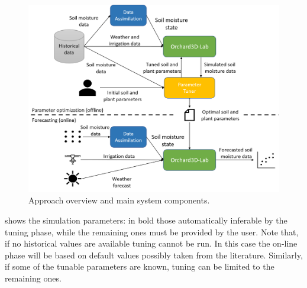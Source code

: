 \begin{figure}[t]
	\centering
	\includegraphics[scale=.5]{chapters/physics-aware/orchard/img/overview3.png}
	\caption{Approach overview and main system components.}
	\label{orchard-fig:overview}
\end{figure}

 shows the simulation parameters: in bold those automatically inferable by the tuning phase, while the remaining ones must be provided by the user. Note that, if no historical values are available tuning cannot be run. In this case the on-line phase will be based on default values possibly taken from the literature. Similarly, if some of the tunable parameters are known, tuning can be limited to the remaining ones.


